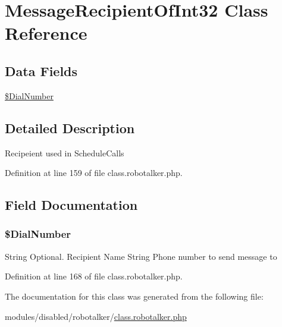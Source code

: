 \hypertarget{class_message_recipient_of_int32}{\section{Message\-Recipient\-Of\-Int32 Class Reference}
\label{class_message_recipient_of_int32}
}
\subsection*{Data Fields}
\begin{DoxyCompactItemize}
\item 
\hyperlink{class_message_recipient_of_int32_a80e5e7a3e0698eb7784c0251e40b8077}{\$\-Dial\-Number}
\end{DoxyCompactItemize}


\subsection{Detailed Description}
Recipeient used in Schedule\-Calls 

Definition at line 159 of file class.\-robotalker.\-php.



\subsection{Field Documentation}
\hypertarget{class_message_recipient_of_int32_a80e5e7a3e0698eb7784c0251e40b8077}{
\subsubsection[{\$\-Dial\-Number}]{\setlength{\rightskip}{0pt plus 5cm}\$Dial\-Number}}\label{class_message_recipient_of_int32_a80e5e7a3e0698eb7784c0251e40b8077}
String Optional. Recipient Name String Phone number to send message to 

Definition at line 168 of file class.\-robotalker.\-php.



The documentation for this class was generated from the following file\-:\begin{DoxyCompactItemize}
\item 
modules/disabled/robotalker/\hyperlink{class_8robotalker_8php}{class.\-robotalker.\-php}\end{DoxyCompactItemize}
